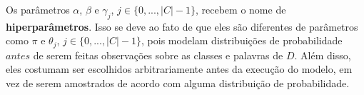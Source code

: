 Os parâmetros \ensuremath{\alpha}, \ensuremath{\beta} e \ensuremath{\gamma_j}, \ensuremath{j \in \{0, ..., |C| - 1\}}, recebem o nome de \textbf{hiperparâmetros}. Isso se deve ao fato de que eles são diferentes de parâmetros como \ensuremath{\pi} e \ensuremath{\theta_j}, \ensuremath{j \in \{0, ..., |C| - 1\}}, pois modelam distribuições de probabilidade \ensuremath{antes} de serem feitas observações sobre as classes e palavras de \ensuremath{D}. Além disso, eles costumam ser escolhidos arbitrariamente antes da execução do modelo, em vez de serem amostrados de acordo com alguma distribuição de probabilidade.








